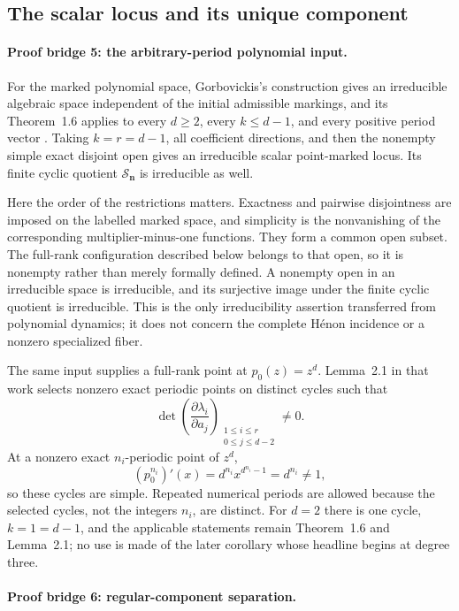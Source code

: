 \documentclass[11pt]{article}
\theoremstyle{definition}
\theoremstyle{remark}
\newcommand{\cS}{\mathcal S}
\newcommand{\bn}{\mathbf n}
\begin{document}
\subsection{The scalar locus and its unique component}

\paragraph{Proof bridge 5: the arbitrary-period polynomial input.}
For the marked polynomial space, Gorbovickis's construction gives an
irreducible algebraic space independent of the initial admissible markings,
and its Theorem~1.6 applies to every $d\geq2$, every $k\leq d-1$, and every
positive period vector \cite{Gor13}.  Taking $k=r=d-1$, all coefficient
directions, and then the nonempty simple exact disjoint open gives an
irreducible scalar point-marked locus.  Its finite cyclic quotient
$\cS_{\bn}$ is irreducible as well.

Here the order of the restrictions matters.  Exactness and pairwise
disjointness are imposed on the labelled marked space, and simplicity is
the nonvanishing of the corresponding multiplier-minus-one functions.
They form a common open subset.  The full-rank configuration described
below belongs to that open, so it is nonempty rather than merely formally
defined.  A nonempty open in an irreducible space is irreducible, and its
surjective image under the finite cyclic quotient is irreducible.  This is
the only irreducibility assertion transferred from polynomial dynamics; it
does not concern the complete Hénon incidence or a nonzero specialized
fiber.

The same input supplies a full-rank point at $p_0(z)=z^d$.  Lemma~2.1 in
that work selects nonzero exact periodic points on distinct cycles such that
\[
  \det\left(
    \frac{\partial\lambda_i}{\partial a_j}
  \right)_{\substack{1\leq i\leq r\\0\leq j\leq d-2}}
  \neq0.
\]
At a nonzero exact $n_i$-periodic point of $z^d$,
\[
  (p_0^{n_i})'(x)
  =
  d^{n_i}x^{d^{n_i}-1}
  =
  d^{n_i}\neq1,
\]
so these cycles are simple.  Repeated numerical periods are allowed because
the selected cycles, not the integers $n_i$, are distinct.  For $d=2$ there
is one cycle, $k=1=d-1$, and the applicable statements remain
Theorem~1.6 and Lemma~2.1; no use is made of the later corollary whose
headline begins at degree three.

\paragraph{Proof bridge 6: regular-component separation.}
\end{document}
